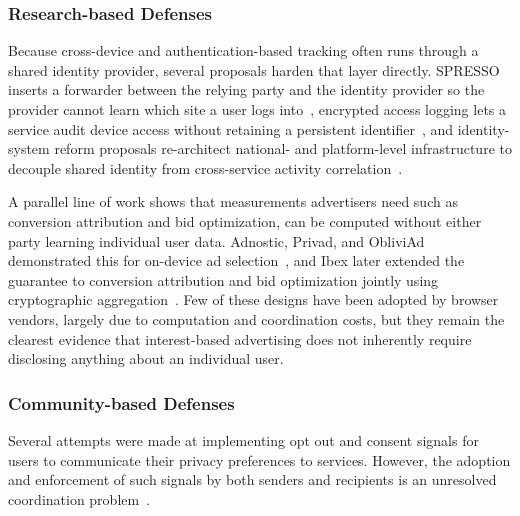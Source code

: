 \subsubsection{Research-based Defenses}
\label{sec:mixed-defenses-research}



%
Because cross-device and authentication-based tracking often runs through a shared identity provider, several proposals harden that layer directly.
%
SPRESSO inserts a forwarder between the relying party and the identity provider so the provider cannot learn which site a user logs into~\cite{fettSPRESSOSecurePrivacyRespecting2015}, encrypted access logging lets a service audit device access without retaining a persistent identifier~\cite{ortegaperezEncryptedAccessLogging2025}, and identity-system reform proposals re-architect national- and platform-level infrastructure to decouple shared identity from cross-service activity correlation~\cite{brandaoMendingTwoNationScale2015}.


%
A parallel line of work shows that measurements advertisers need such as conversion attribution and bid optimization, can be computed without either party learning individual user data.
%
Adnostic, Privad, and ObliviAd demonstrated this for on-device ad selection~\cite{toubianaAdnosticPrivacyPreserving2010,guhaPrivadPracticalPrivacy2011,backesObliviAdProvablySecure2012}, and Ibex later extended the guarantee to conversion attribution and bid optimization jointly using cryptographic aggregation~\cite{zhongIbexPrivacypreservingAd2022}.
%
Few of these designs have been adopted by browser vendors, largely due to computation and coordination costs, but they remain the clearest evidence that interest-based advertising does not inherently require disclosing anything about an individual user.


\subsubsection{Community-based Defenses}
\label{sec:mixed-defenses-community}


%
Several attempts were made at implementing opt out and consent signals for users to communicate their privacy preferences to services. However, the adoption and enforcement of such signals by both senders and recipients is an unresolved coordination problem~\cite{hilsPrivacyPreferenceSignals2021}.

